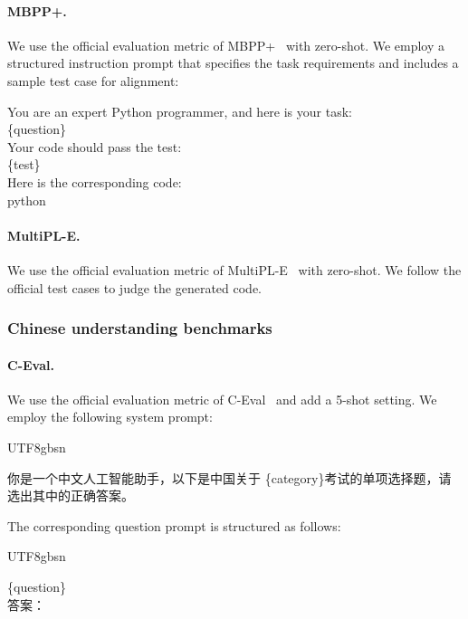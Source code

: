 \paragraph{MBPP+.} We use the official evaluation metric of MBPP+~\cite{liu2023evalplus} with zero-shot. We employ a structured instruction prompt that specifies the task requirements and includes a sample test case for alignment:

\begin{MyBox}{}

You are an expert Python programmer, and here is your task: \\
  \{question\} \\
  Your code should pass the test: \\
  \{test\} \\
  Here is the corresponding code: \\
  \textasciigrave\textasciigrave\textasciigrave python
\end{MyBox}

\paragraph{MultiPL-E.} We use the official evaluation metric of MultiPL-E~\cite{cassano2022multipl} with zero-shot. We follow the official test cases to judge the generated code.

\subsubsection{Chinese understanding benchmarks}

\paragraph{C-Eval.} We use the official evaluation metric of C-Eval~\cite{huang2023ceval} and add a 5-shot setting. We employ the following system prompt:

\begin{CJK*}{UTF8}{gbsn}
\begin{MyBox}{}

    \raggedright
    你是一个中文人工智能助手，以下是中国关于 \{category\}考试的单项选择题，请选出其中的正确答案。
\end{MyBox}
\end{CJK*}

The corresponding question prompt is structured as follows:

\begin{CJK*}{UTF8}{gbsn}
\begin{MyBox}{}

    \{question\} \\
    答案：
\end{MyBox}
\end{CJK*}


